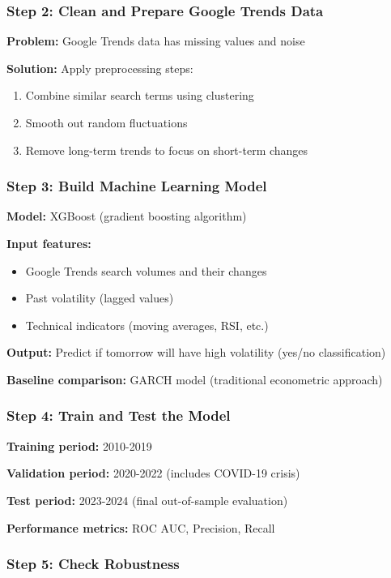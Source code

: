 \documentclass[12pt,a4paper]{article}
\begin{document}
\subsubsection{Step 2: Clean and Prepare Google Trends Data}

\textbf{Problem:} Google Trends data has missing values and noise

\textbf{Solution:} Apply preprocessing steps:
\begin{enumerate}
    \item Combine similar search terms using clustering
    \item Smooth out random fluctuations
    \item Remove long-term trends to focus on short-term changes
\end{enumerate}

\subsubsection{Step 3: Build Machine Learning Model}

\textbf{Model:} XGBoost (gradient boosting algorithm)

\textbf{Input features:}
\begin{itemize}
    \item Google Trends search volumes and their changes
    \item Past volatility (lagged values)
    \item Technical indicators (moving averages, RSI, etc.)
\end{itemize}

\textbf{Output:} Predict if tomorrow will have high volatility (yes/no classification)

\textbf{Baseline comparison:} GARCH model (traditional econometric approach)

\subsubsection{Step 4: Train and Test the Model}

\textbf{Training period:} 2010-2019

\textbf{Validation period:} 2020-2022 (includes COVID-19 crisis)

\textbf{Test period:} 2023-2024 (final out-of-sample evaluation)

\textbf{Performance metrics:} ROC AUC, Precision, Recall

\subsubsection{Step 5: Check Robustness}
\end{document}

